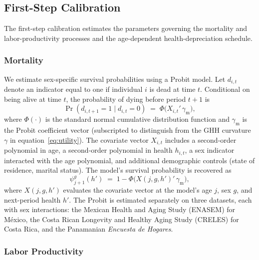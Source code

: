 \documentclass[12pt,a4paper]{article}
\begin{document}
\subsection{First-Step Calibration}

The first-step calibration estimates the parameters governing the mortality and labor-productivity processes and the age-dependent health-depreciation schedule.

\subsubsection{Mortality}

We estimate sex-specific survival probabilities using a Probit model. Let $d_{i,t}$ denote an indicator equal to one if individual $i$ is dead at time $t$. Conditional on being alive at time $t$, the probability of dying before period $t+1$ is
\begin{equation}
\label{eq:probit}
\Pr(d_{i,t+1}=1 \mid d_{i,t}=0) \;=\; \Phi\bigl(X_{i,t}'\,\gamma_{\mathrm{m}}\bigr),
\end{equation}
where $\Phi(\cdot)$ is the standard normal cumulative distribution function and $\gamma_{\mathrm{m}}$ is the Probit coefficient vector (subscripted to distinguish from the GHH curvature $\gamma$ in equation~\eqref{eq:utility}). The covariate vector $X_{i,t}$ includes a second-order polynomial in age, a second-order polynomial in health $h_{i,t}$, a sex indicator interacted with the age polynomial, and additional demographic controls (state of residence, marital status). The model's survival probability is recovered as
\begin{equation}
\label{eq:survival_recovery}
\psi^{g}_{j+1}(h') \;=\; 1 - \Phi\bigl(X(j, g, h')'\,\gamma_{\mathrm{m}}\bigr),
\end{equation}
where $X(j, g, h')$ evaluates the covariate vector at the model's age $j$, sex $g$, and next-period health $h'$. The Probit is estimated separately on three datasets, each with sex interactions: the Mexican Health and Aging Study (ENASEM) for M\'exico, the Costa Rican Longevity and Healthy Aging Study (CRELES) for Costa Rica, and the Panamanian \textit{Encuesta de Hogares}.

\subsubsection{Labor Productivity}
\end{document}
